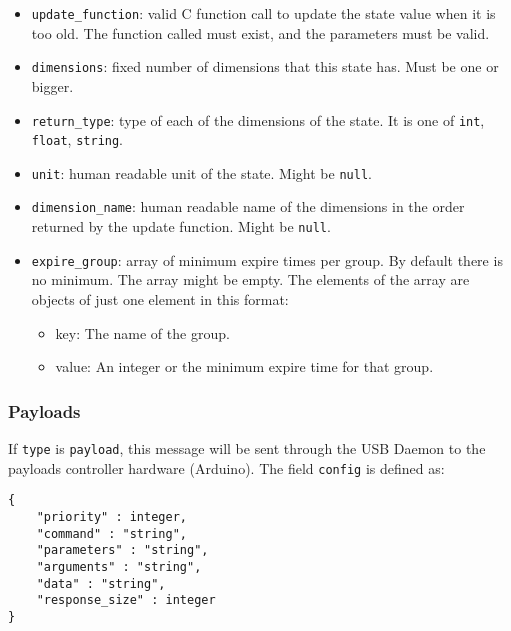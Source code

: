 \documentclass[12pt,a4paper]{report}
\begin{document}
\begin{itemize}
\item \texttt{update\_function}: valid C function call to update the state value when it is too old. The function called must exist, and the parameters must be valid.
\item \texttt{dimensions}: fixed number of dimensions that this state has. Must be one or bigger.
\item \texttt{return\_type}: type of each of the dimensions of the state. It is one of \texttt{int}, \texttt{float}, \texttt{string}.
\item \texttt{unit}: human readable unit of the state. Might be \texttt{null}.
\item \texttt{dimension\_name}: human readable name of the dimensions in the order returned by the update function. Might be \texttt{null}.
\item \texttt{expire\_group}: array of minimum expire times per group. By default there is no minimum. The array might be empty. The elements of the array are objects of just one element in this format:
\begin{itemize}
\item key: The name of the group.
\item value: An integer or the minimum expire time for that group.
\end{itemize}
\end{itemize}

\subsubsection*{Payloads}
If \texttt{type} is \texttt{payload}, this message will be sent through the USB Daemon to the payloads controller hardware (Arduino). The field \texttt{config} is defined as:
\begin{lstlisting}
{
    "priority" : integer,
    "command" : "string",
    "parameters" : "string",
    "arguments" : "string",
    "data" : "string",
    "response_size" : integer
}
\end{lstlisting}
\end{document}
